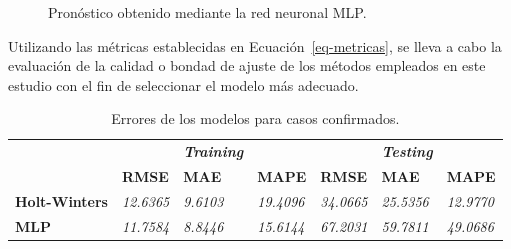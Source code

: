 \documentclass[
  letterpaper,
  DIV=11,
  numbers=noendperiod]{scrreport}
\theoremstyle{plain}
\theoremstyle{definition}
\theoremstyle{definition}
\theoremstyle{plain}
\theoremstyle{remark}
\begin{document}
\begin{figure}


\caption{\label{fig-pmlpd}Pronóstico obtenido mediante la red neuronal
MLP.}

\end{figure}%

Utilizando las métricas establecidas en Ecuación~\ref{eq-metricas}, se
lleva a cabo la evaluación de la calidad o bondad de ajuste de los
métodos empleados en este estudio con el fin de seleccionar el modelo
más adecuado.

\begin{longtable}[]{@{}
  >{\raggedright\arraybackslash}p{}
  >{\centering\arraybackslash}p{}
  >{\centering\arraybackslash}p{}
  >{\centering\arraybackslash}p{}
  >{\centering\arraybackslash}p{}
  >{\centering\arraybackslash}p{}
  >{\centering\arraybackslash}p{}@{}}
\caption{Errores de los modelos para casos
confirmados.}\label{tbl-errd}\tabularnewline
\toprule\noalign{}
\endfirsthead
\endhead
\bottomrule\noalign{}
\endlastfoot
& & \textbf{\emph{Training}} & & & \textbf{\emph{Testing}} & \\
& \textbf{RMSE} & \textbf{MAE} & \textbf{MAPE} & \textbf{RMSE} &
\textbf{MAE} & \textbf{MAPE} \\
\textbf{Holt-Winters} & \emph{12.6365} & \emph{9.6103} & \emph{19.4096}
& \emph{34.0665} & \emph{25.5356} & \emph{12.9770} \\
\textbf{MLP} & \emph{11.7584} & \emph{8.8446} & \emph{15.6144} &
\emph{67.2031} & \emph{59.7811} & \emph{49.0686} \\
\end{longtable}
\end{document}
